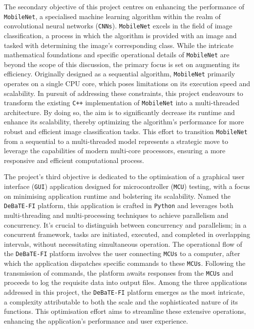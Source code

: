 \documentclass[12pt, openany]{book}
\begin{document}
The secondary objective of this project centres on enhancing the performance of \texttt{MobileNet}, a specialised machine learning algorithm within the realm of convolutional neural networks (\texttt{CNNs}). \texttt{MobileNet} excels in the field of image classification, a process in which the algorithm is provided with an image and tasked with determining the image's corresponding class. While the intricate mathematical foundations and specific operational details of \texttt{MobileNet} are beyond the scope of this discussion, the primary focus is set on augmenting its efficiency. Originally designed as a sequential algorithm, \texttt{MobileNet} primarily operates on a single CPU core, which poses limitations on its execution speed and scalability. In pursuit of addressing these constraints, this project endeavours to transform the existing \texttt{C++} implementation of \texttt{MobileNet} into a multi-threaded architecture. By doing so, the aim is to significantly decrease its runtime and enhance its scalability, thereby optimizing the algorithm's performance for more robust and efficient image classification tasks. This effort to transition \texttt{MobileNet} from a sequential to a multi-threaded model represents a strategic move to leverage the capabilities of modern multi-core processors, ensuring a more responsive and efficient computational process.

The project's third objective is dedicated to the optimisation of a graphical user interface (\texttt{GUI}) application designed for microcontroller (\texttt{MCU}) testing, with a focus on minimising application runtime and bolstering its scalability. Named the \texttt{DeBaTE-FI} platform, this application is crafted in \texttt{Python} and leverages both multi-threading and multi-processing techniques to achieve parallelism and concurrency. It's crucial to distinguish between concurrency and parallelism; in a concurrent framework, tasks are initiated, executed, and completed in overlapping intervals, without necessitating simultaneous operation. The operational flow of the \texttt{DeBaTE-FI} platform involves the user connecting \texttt{MCUs} to a computer, after which the application dispatches specific commands to these \texttt{MCUs}. Following the transmission of commands, the platform awaits responses from the \texttt{MCUs} and proceeds to log the requisite data into output files. Among the three applications addressed in this project, the \texttt{DeBaTE-FI} platform emerges as the most intricate, a complexity attributable to both the scale and the sophisticated nature of its functions. This optimisation effort aims to streamline these extensive operations, enhancing the application's performance and user experience.
\end{document}
